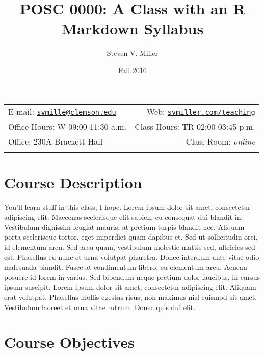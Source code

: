 \documentclass[11pt,]{article}
\title{POSC 0000: A Class with an R Markdown Syllabus}
\author{Steven V. Miller}
\date{Fall 2016}
\begin{document}
  

		\maketitle
		
	
		\thispagestyle{firststyle}



	\noindent \begin{tabular*}{\textwidth}{ @{\extracolsep{\fill}} lr @{\extracolsep{\fill}}}


E-mail: \texttt{\href{mailto:svmille@clemson.edu}{\nolinkurl{svmille@clemson.edu}}} & Web: \href{http://svmiller.com/teaching}{\tt svmiller.com/teaching}\\
Office Hours: W 09:00-11:30 a.m.  &  Class Hours: TR 02:00-03:45 p.m.\\
Office: 230A Brackett Hall  & Class Room: \emph{online}\\
	&  \\
	\hline
	\end{tabular*}
	
\vspace{2mm}
	


\section{Course Description}\label{course-description}

You'll learn stuff in this class, I hope. Lorem ipsum dolor sit amet,
consectetur adipiscing elit. Maecenas scelerisque elit sapien, eu
consequat dui blandit in. Vestibulum dignissim feugiat mauris, at
pretium turpis blandit nec. Aliquam porta scelerisque tortor, eget
imperdiet quam dapibus et. Sed ut sollicitudin orci, id elementum arcu.
Sed arcu quam, vestibulum molestie mattis sed, ultricies sed est.
Phasellus eu nunc et urna volutpat pharetra. Donec interdum ante vitae
odio malesuada blandit. Fusce at condimentum libero, eu elementum arcu.
Aenean posuere id lorem in varius. Sed bibendum neque pretium dolor
faucibus, in cursus ipsum suscipit. Lorem ipsum dolor sit amet,
consectetur adipiscing elit. Aliquam erat volutpat. Phasellus mollis
egestas risus, non maximus nisl euismod sit amet. Vestibulum laoreet et
urna vitae rutrum. Donec quis dui elit.

\section{Course Objectives}\label{course-objectives}
\end{document}
